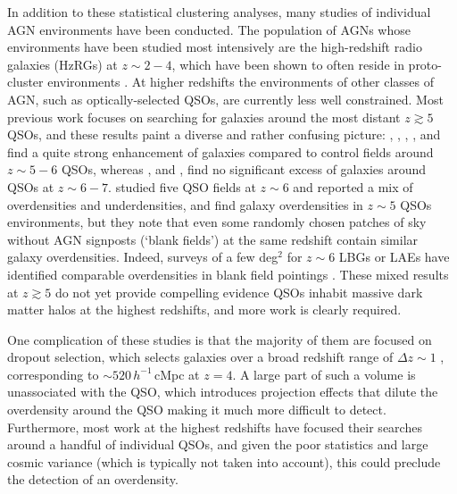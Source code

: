 \documentclass[iop, revtex4]{emulateapj}
\begin{document}
In addition to these statistical clustering analyses, many
studies of individual AGN environments have been conducted. 
The population of AGNs whose environments have been
studied most intensively are the high-redshift radio galaxies (HzRGs)
at $z\sim2-4$, which have been shown to often reside in proto-cluster
environments \citep[e.g.][]{Venemans07, Intema06, Overzier08,
  Hennawi15}.
At higher redshifts the environments of other classes of AGN, such as
optically-selected QSOs, are currently less well constrained. Most
previous work focuses on searching for galaxies around the most
distant $z\gtrsim5$ QSOs, and these results paint a diverse and rather
confusing picture: \citet{Stiavelli05}, \citet{Zheng06},
\citet{Kashikawa07}, \citet{Utsumi10}, and \citet{Morselli14} find a
quite strong enhancement of galaxies compared to control fields around
$z\sim5-6$ QSOs, whereas \citet{Willott05}
\citet{Banados13},\citet{Simpson14} and \citet{Mazzucchelli16}, find
no significant excess of galaxies around QSOs at
$z\sim6-7$.
\citet{Kim09} studied five QSO fields at $z\sim6$ and reported a mix
of overdensities and underdensities, and \citet{Husband13} find galaxy
overdensities in $z\sim5$ QSOs environments, but they note that even
some randomly chosen patches of sky without AGN signposts (`blank
fields') at the same redshift contain similar galaxy overdensities.
Indeed, surveys of a few deg$^{2}$ for $z\sim6$ LBGs or LAEs
have identified comparable overdensities in blank field pointings
\citep[e.g.][]{Ouchi05, Ota08, Toshikawa12}.
These mixed results at
$z\gtrsim5$ do not yet provide compelling
evidence QSOs inhabit
massive dark matter halos at the highest redshifts, and more work
is clearly required.

One complication of these studies is that the majority of them are
focused on dropout selection, which selects galaxies over a broad
redshift range of $\Delta z\sim1$ \citep[e.g.][]{Ouchi04a}, 
corresponding to $\sim520\,h^{-1}$\,cMpc at $z=4$. 
A large part of such a volume is unassociated with the QSO, which
introduces projection effects that dilute the overdensity around the
QSO making it much more difficult to detect.  Furthermore, most work
at the highest redshifts have focused their searches around
a handful of individual QSOs, and given the poor statistics and
large cosmic variance (which is typically not taken into account),
this could preclude the detection of an overdensity.
\end{document}
